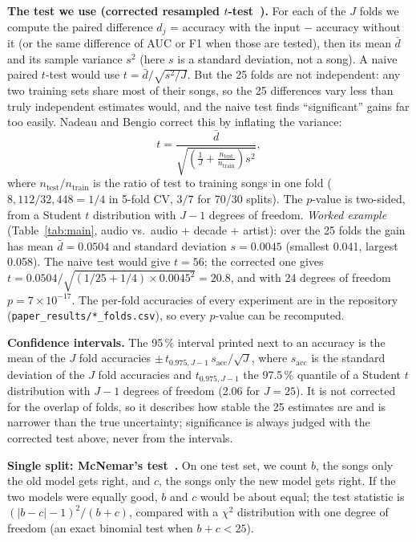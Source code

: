 \documentclass[conference]{IEEEtran}
\begin{document}
\textbf{The test we use (corrected resampled $t$-test~\cite{nadeau2003inference}).} For each of the $J$ folds we
compute the paired difference $d_j$ = accuracy with the input $-$ accuracy without it (or the same difference of
AUC or F1 when those are tested), then its mean $\bar d$ and
its sample variance $s^2$ (here $s$ is a standard deviation, not a song). A naive paired $t$-test would use $t=\bar d/\sqrt{s^2/J}$. But the 25 folds are not
independent: any two training sets share most of their songs, so the 25 differences vary less than truly
independent estimates would, and the naive test finds ``significant'' gains far too easily. Nadeau and Bengio
correct this by inflating the variance:
\begin{equation}
t=\frac{\bar d}{\sqrt{\left(\frac{1}{J}+\frac{n_{\text{test}}}{n_{\text{train}}}\right)s^2}},
\end{equation}
where $n_{\text{test}}/n_{\text{train}}$ is the ratio of test to training songs in one fold ($8{,}112/32{,}448 = 1/4$
in 5-fold CV, $3/7$ for 70/30 splits). The $p$-value is two-sided, from a Student $t$ distribution with $J-1$
degrees of freedom. \emph{Worked example} (Table~\ref{tab:main}, audio vs.\ audio + decade + artist): over the 25
folds the gain has mean $\bar d=0.0504$ and standard deviation $s=0.0045$ (smallest 0.041, largest 0.058). The
naive test would give $t=56$; the corrected one gives $t=0.0504/\sqrt{(1/25+1/4)\times0.0045^2}=20.8$, and with 24
degrees of freedom $p=7\times10^{-17}$. The per-fold accuracies of every experiment are in the repository
(\texttt{paper\_results/*\_folds.csv}), so every $p$-value can be recomputed.

\textbf{Confidence intervals.} The 95\,\% interval printed next to an accuracy is the mean of the $J$ fold
accuracies $\pm\,t_{0.975,J-1}\,s_{\text{acc}}/\sqrt{J}$, where $s_{\text{acc}}$ is the standard deviation of the $J$
fold accuracies and $t_{0.975,J-1}$ the 97.5\,\% quantile of a Student $t$ distribution with $J-1$ degrees of
freedom (2.06 for $J=25$). It is not corrected for the overlap of folds, so it
describes how stable the 25 estimates are and is narrower than the true uncertainty; significance is always
judged with the corrected test above, never from the intervals.

\textbf{Single split: McNemar's test~\cite{dietterich1998approximate}.} On one test set, we count $b$, the songs only
the old model gets right, and $c$, the songs only the new model gets right. If the two models were equally good, $b$
and $c$ would be about equal; the test statistic is $(|b-c|-1)^2/(b+c)$, compared with a $\chi^2$ distribution
with one degree of freedom (an exact binomial test when $b+c<25$).
\end{document}
